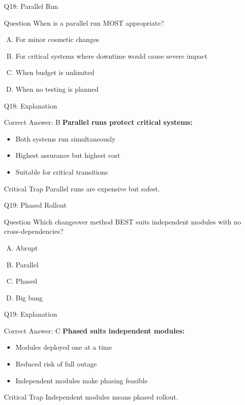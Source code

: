 \documentclass{beamer}
\begin{document}
	\begin{frame}{Q18: Parallel Run}
		\begin{block}{Question}
			When is a parallel run MOST appropriate?
		\end{block}
		\begin{enumerate}[(A)]
			\item For minor cosmetic changes
			\item For critical systems where downtime would cause severe impact
			\item When budget is unlimited
			\item When no testing is planned
		\end{enumerate}
	\end{frame}
	
	\begin{frame}{Q18: Explanation}
		\begin{block}{Correct Answer: B}
			\textbf{Parallel runs protect critical systems:}
			\begin{itemize}
				\item Both systems run simultaneously
				\item Highest assurance but highest cost
				\item Suitable for critical transitions
			\end{itemize}
		\end{block}
		\begin{alertblock}{Critical Trap}
			Parallel runs are expensive but safest.
		\end{alertblock}
	\end{frame}
	
	\begin{frame}{Q19: Phased Rollout}
		\begin{block}{Question}
			Which changeover method BEST suits independent modules with no cross-dependencies?
		\end{block}
		\begin{enumerate}[(A)]
			\item Abrupt
			\item Parallel
			\item Phased
			\item Big bang
		\end{enumerate}
	\end{frame}
	
	\begin{frame}{Q19: Explanation}
		\begin{block}{Correct Answer: C}
			\textbf{Phased suits independent modules:}
			\begin{itemize}
				\item Modules deployed one at a time
				\item Reduced risk of full outage
				\item Independent modules make phasing feasible
			\end{itemize}
		\end{block}
		\begin{alertblock}{Critical Trap}
			Independent modules means phased rollout.
		\end{alertblock}
	\end{frame}
	
\end{document}
